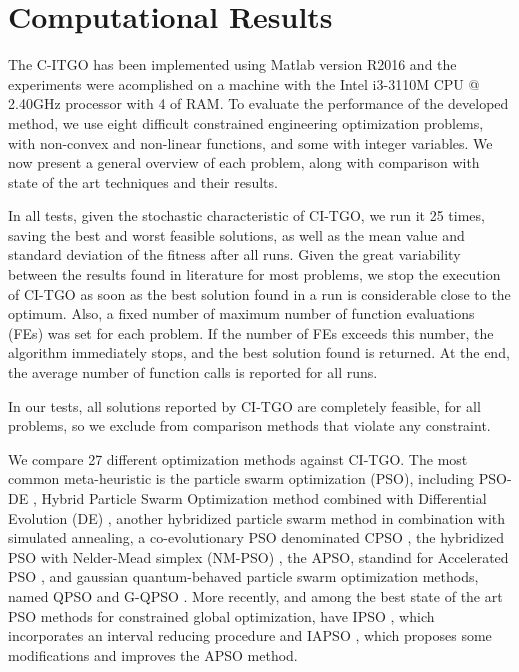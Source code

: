 \section{Computational Results} \label{sec:Results}

The C-ITGO has been implemented using Matlab version R2016 and the experiments were acomplished on a machine with the Intel i3-3110M CPU @ 2.40GHz processor with 4 of RAM. To evaluate the performance of the developed method, we use eight difficult constrained engineering optimization problems, with non-convex and non-linear functions, and some with integer variables. We now present a general overview of each problem, along with comparison with state of the art techniques and their results.

In all tests, given the stochastic characteristic of CI-TGO, we run it 25 times, saving the best and worst feasible solutions, as well as the mean value and standard deviation of the fitness after all runs. Given the great variability between the results found in literature for most problems, we stop the execution of CI-TGO as soon as the best solution found in a run is considerable close to the optimum. Also, a fixed number of maximum number of function evaluations (FEs) was set for each problem. If the number of FEs exceeds this number, the algorithm immediately stops, and the best solution found is returned. At the end, the average number of function calls is reported for all runs.

In our tests, all solutions reported by CI-TGO are completely feasible, for all problems, so we exclude from comparison methods that violate any constraint.

We compare 27 different optimization methods against CI-TGO. The most common meta-heuristic is the particle swarm optimization (PSO), including PSO-DE \citep{PSO-DE}, Hybrid Particle Swarm Optimization method combined with Differential Evolution (DE) \citep{HPSO}, another hybridized particle swarm method in combination with simulated annealing, a co-evolutionary PSO denominated CPSO \citep{CPSO}, the hybridized PSO with Nelder-Mead simplex (NM-PSO) \citep{NM-PSO}, the APSO, standind for Accelerated PSO  \citep{APSO}, and gaussian quantum-behaved particle swarm optimization methods, named QPSO and G-QPSO \citep{QPSO}. More recently, and among the best state of the art PSO methods for constrained global optimization, have IPSO \citep{IPSO}, which incorporates an interval reducing procedure and IAPSO \citep{IAPSO}, which proposes some modifications and improves the APSO method.

